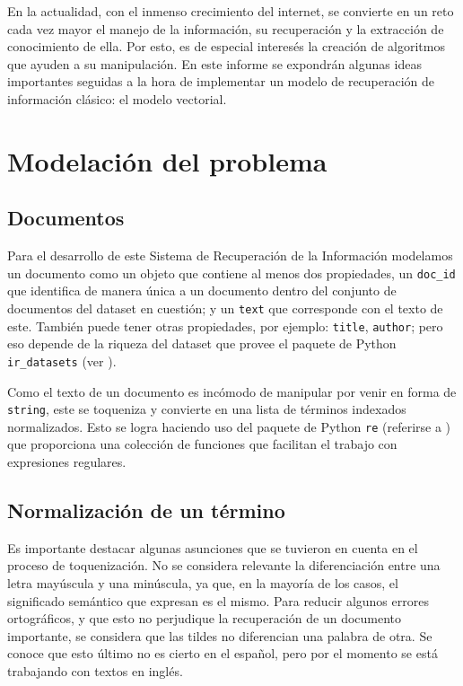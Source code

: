 \documentclass{llncs}
\begin{document}
	En la actualidad, con el inmenso crecimiento del internet, se convierte en un reto cada vez mayor el manejo de la información, su recuperaci\'on y la extracci\'on de conocimiento de ella. Por esto, es de especial interes\'es la creaci\'on de algoritmos que ayuden a su manipulaci\'on. En este informe se expondr\'an algunas ideas importantes seguidas a la hora de implementar un modelo de recuperaci\'on de informaci\'on cl\'asico: el modelo vectorial.
	
	\section{Modelaci\'on del problema}
	
	\subsection{Documentos}
	Para el desarrollo de este Sistema de Recuperaci\'on de la Informaci\'on modelamos un documento como un objeto que contiene al menos dos propiedades, un \texttt{doc\_id} que identifica de manera \'unica a un documento dentro del conjunto de documentos del dataset en cuesti\'on; y un \texttt{text} que corresponde con el texto de este. Tambi\'en puede tener otras propiedades, por ejemplo: \texttt{title}, \texttt{author}; pero eso depende de la riqueza del dataset que provee el paquete de Python \texttt{ir\_datasets} (ver \cite{B3}).
	
	Como el texto de un documento es inc\'omodo de manipular por venir en forma de \texttt{string}, este se toqueniza y convierte en una lista de t\'erminos indexados normalizados. Esto se logra haciendo uso del paquete de Python \texttt{re} (referirse a \cite{B4}) que proporciona una colecci\'on de funciones que facilitan el trabajo con expresiones regulares. 
	
	\subsection{Normalizaci\'on de un t\'ermino}
	
	Es importante destacar algunas asunciones que se tuvieron en cuenta en el proceso de toquenizaci\'on. No se considera relevante la diferenciación entre una letra may\'uscula y una min\'uscula, ya que, en la mayoría de los casos, el significado sem\'antico que expresan es el mismo. Para reducir algunos errores ortográficos, y que esto no perjudique la recuperaci\'on de un documento importante, se considera que las tildes no diferencian una palabra de otra. Se conoce que esto \'ultimo no es cierto en el español, pero por el momento se est\'a trabajando con textos en ingl\'es.
	
\end{document}

